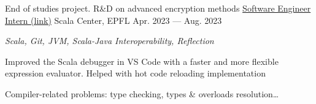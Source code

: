 \begin{MainPart}
{    \vspace{0.5\baselineskip}
    End of studies project. R\&D on advanced encryption methods
  }
  \Experience%
  {\href{https://github.com/scalacenter/scala-debug-adapter/pulls?q=is\%3Apr+author\%3Aiusildra+}{Software Engineer Intern (link)}}
  {Scala Center, EPFL}
  {Apr. 2023 --- Aug. 2023}
  {
    \textit{Scala, Git, JVM, Scala-Java Interoperability, Reflection}
    \begin{ItemList}{\ColorHighlight}
      \item[\ding{226}] Improved the Scala debugger in VS Code with a faster and more flexible expression evaluator. Helped with hot code reloading implementation
      \item[\ding{226}] Compiler-related problems: type checking, types \& overloads resolution\dots
    \end{ItemList}
  }

\end{MainPart}